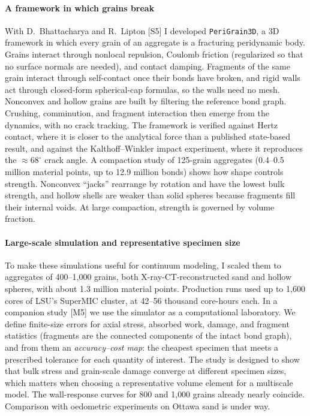\documentclass[11pt]{article}
\newcommand{\rc}[1]{\textcolor{accent}{[#1]}}
\begin{document}
\paragraph{A framework in which grains break}
With D.~Bhattacharya and R.~Lipton \rc{S5} I developed \texttt{PeriGrain3D}, a
3D framework in which every grain of an aggregate is a fracturing peridynamic
body. %
Grains interact through nonlocal repulsion, Coulomb friction (regularized so
that no surface normals are needed), and contact damping. Fragments of the same
grain interact through self-contact once their bonds have broken, and rigid
walls act through closed-form spherical-cap formulas, so the walls need no
mesh. Nonconvex and hollow grains are built by filtering the reference bond
graph. Crushing, comminution, and fragment interaction then emerge from the
dynamics, with no crack tracking. The framework is verified against Hertz
contact, where it is closer to the analytical force than a published
state-based result, and against the Kalthoff--Winkler impact experiment, where
it reproduces the ${\approx}68^\circ$ crack angle. A compaction study of
125-grain aggregates (0.4--0.5 million material points, up to 12.9 million
bonds) shows how shape controls strength. Nonconvex ``jacks'' rearrange by
rotation and have the lowest bulk strength, and hollow shells are weaker than
solid spheres because fragments fill their internal voids. At large compaction,
strength is governed by volume fraction.

\paragraph{Large-scale simulation and representative specimen size}
To make these simulations useful for continuum modeling, I scaled them to
aggregates of 400--1{,}000 grains, both X-ray-CT-reconstructed sand and hollow
spheres, with about 1.3 million material points. Production runs used up to
1{,}600 cores of LSU's SuperMIC cluster, at 42--56 thousand core-hours each.
In a companion study \rc{M5} we use the simulator as a computational
laboratory. We define finite-size errors for axial stress, absorbed work,
damage, and fragment statistics (fragments are the connected components of the
intact bond graph), and from them an \emph{accuracy--cost map}: the cheapest
specimen that meets a prescribed tolerance for each quantity of interest. The
study is designed to show that bulk stress and grain-scale damage converge at
different specimen sizes, which matters when choosing a representative volume
element for a multiscale model. The wall-response curves for 800 and 1{,}000
grains already nearly coincide. Comparison with oedometric experiments on
Ottawa sand is under way. %
\end{document}
